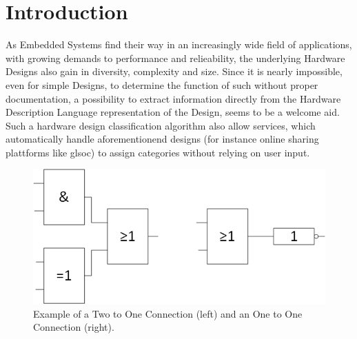 
\section{Introduction}
As Embedded Systems find their way in an increasingly wide field of applications,
with growing demands to performance and relieability, the underlying Hardware 
Designs also gain in diversity, complexity and size. Since it is nearly impossible,
even for simple Designs, to determine the function of such without proper
documentation, a possibility to extract information directly from the Hardware 
Description Language representation of the Design, seems to be a welcome aid.
Such a hardware design classification algorithm also allow services, which 
automatically handle aforementionend designs (for instance online sharing 
plattforms like gls{oc}) to assign categories without relying on user input.

\begin{figure}[h]
 \centering
 \includegraphics[width=\textwidth,keepaspectratio]{../pictures/logicGates.png}
 \caption{Example of a Two to One Connection (left) and an One to One Connection (right).}
 \label{fig:logicGates}
\end{figure}

